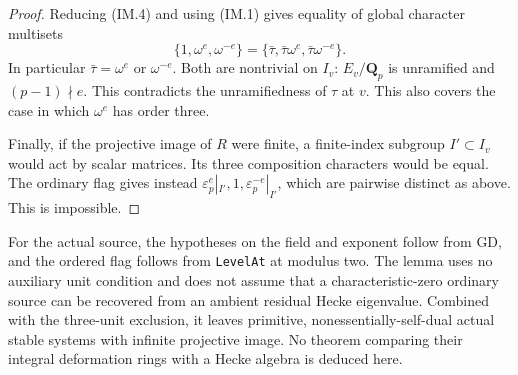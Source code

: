 \begin{proof}
Reducing (IM.4) and using (IM.1) gives equality of global
character multisets
\[
 \{1,\omega^e,\omega^{-e}\}
       =\{\bar\tau,\bar\tau\omega^e,
                                  \bar\tau\omega^{-e}\}. \tag{IM.5}
\]
In particular $\bar\tau=\omega^e$ or $\omega^{-e}$.
Both are nontrivial on $I_v$: $E_v/\mathbf Q_p$ is unramified
and $(p-1)\nmid e$.  This contradicts the unramifiedness of
$\tau$ at $v$.  This also covers the case in which
$\omega^e$ has order three.

Finally, if the projective image of $R$ were finite, a
finite-index subgroup $I'\subset I_v$ would act by scalar
matrices.  Its three composition characters would be equal.
The ordinary flag gives instead
$\varepsilon_p^e|_{I'},1,\varepsilon_p^{-e}|_{I'}$, which
are pairwise distinct as above.  This is impossible.
\end{proof}

For the actual source, the hypotheses on the field and exponent
follow from GD, and the ordered flag follows from
\texttt{LevelAt} at modulus two.  The lemma uses no auxiliary
unit condition and does not assume that a characteristic-zero
ordinary source can be recovered from an ambient residual
Hecke eigenvalue.  Combined with the three-unit exclusion,
it leaves primitive, nonessentially-self-dual actual stable
systems with infinite projective image.  No theorem comparing
their integral deformation rings with a Hecke algebra is
deduced here.
